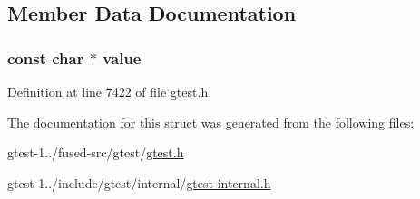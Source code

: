 \subsection{\-Member \-Data \-Documentation}
\hypertarget{structtesting_1_1internal_1_1ConstCharPtr_a92d544bd66c050551f3d87fa55eb3f5d}{
\subsubsection[{value}]{\setlength{\rightskip}{0pt plus 5cm}const char $\ast$ {\bf value}}}\label{de/d08/structtesting_1_1internal_1_1ConstCharPtr_a92d544bd66c050551f3d87fa55eb3f5d}


\-Definition at line 7422 of file gtest.\-h.



\-The documentation for this struct was generated from the following files\-:\begin{DoxyCompactItemize}
\item 
gtest-\/1../fused-\/src/gtest/\hyperlink{fused-src_2gtest_2gtest_8h}{gtest.\-h}\item 
gtest-\/1../include/gtest/internal/\hyperlink{gtest-internal_8h}{gtest-\/internal.\-h}\end{DoxyCompactItemize}
